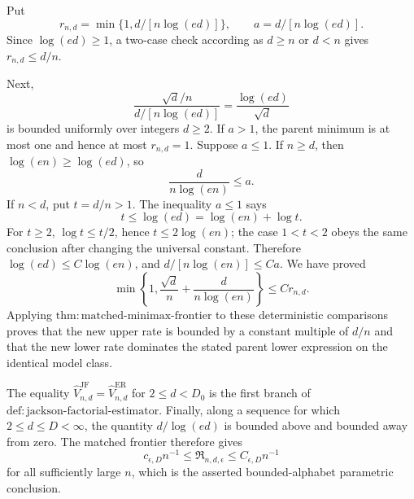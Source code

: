 Put
\[
 r_{n,d}=\min\{1,d/[n\log(ed)]\},
 \qquad a=d/[n\log(ed)].
\]
Since \(\log(ed)\geq1\), a two-case check according as \(d\geq n\) or \(d<n\) gives \(r_{n,d}\leq d/n\).

Next,
\[
 \frac{\sqrt d/n}{d/[n\log(ed)]}=\frac{\log(ed)}{\sqrt d}
\]
is bounded uniformly over integers \(d\geq2\).  If \(a>1\), the parent minimum is at most one and hence at most \(r_{n,d}=1\).  Suppose \(a\leq1\).  If \(n\geq d\), then \(\log(en)\geq\log(ed)\), so
\[
 \frac d{n\log(en)}\leq a.
\]
If \(n<d\), put \(t=d/n>1\).  The inequality \(a\leq1\) says
\[
 t\leq\log(ed)=\log(en)+\log t.
\]
For \(t\geq2\), \(\log t\leq t/2\), hence \(t\leq2\log(en)\); the case \(1<t<2\) obeys the same conclusion after changing the universal constant.  Therefore \(\log(ed)\leq C\log(en)\), and \(d/[n\log(en)]\leq Ca\).  We have proved
\[
 \min\left\{1,\frac{\sqrt d}{n}+\frac d{n\log(en)}\right\}
 \leq C r_{n,d}.                                                     \tag{23}
\]
Applying \(\mathrm{thm:matched\mbox{-}minimax\mbox{-}frontier}\) to these deterministic comparisons proves that the new upper rate is bounded by a constant multiple of \(d/n\) and that the new lower rate dominates the stated parent lower expression on the identical model class.

The equality \(\widehat V_{n,d}^{\mathrm{JF}}=\widehat V_{n,d}^{\mathrm{ER}}\) for \(2\leq d<D_0\) is the first branch of \(\mathrm{def:jackson\mbox{-}factorial\mbox{-}estimator}\).  Finally, along a sequence for which \(2\leq d\leq D<\infty\), the quantity \(d/\log(ed)\) is bounded above and bounded away from zero.  The matched frontier therefore gives
\[
 c_{\epsilon,D}n^{-1}\leq\mathfrak R_{n,d,\epsilon}
 \leq C_{\epsilon,D}n^{-1}
\]
for all sufficiently large \(n\), which is the asserted bounded-alphabet parametric conclusion.